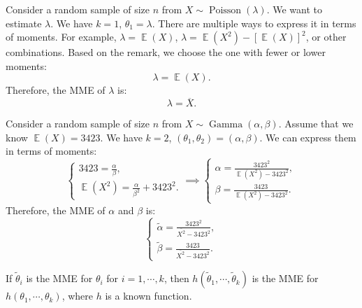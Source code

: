 \documentclass{huhtakm-template-book-v2}
\DeclareMathOperator{\E}{\mathbb{E}}
\DeclareMathOperator{\Poisson}{Poisson}
\DeclareMathOperator{\Gam}{Gamma}
\begin{document}
    \begin{eg}
        Consider a random sample of size $n$ from $X \sim \Poisson(\lambda)$. We want to estimate $\lambda$. We have $k = 1$, $\theta_{1} = \lambda$. There are multiple ways to express it in terms of moments. For example, $\lambda = \E(X)$, $\lambda = \E(X^{2}) - [\E(X)]^{2}$, or other combinations. Based on the remark, we choose the one with fewer or lower moments:
        \begin{equation*}
            \lambda = \E(X).
        \end{equation*}
        Therefore, the MME of $\lambda$ is:
        \begin{equation*}
            \lambda = \overline{X}.
        \end{equation*}
    \end{eg}
    \begin{eg}
        Consider a random sample of size $n$ from $X \sim \Gam(\alpha, \beta)$. Assume that we know $\E(X) = 3423$. We have $k = 2$, $(\theta_{1}, \theta_{2}) = (\alpha, \beta)$. We can express them in terms of moments:
        \begin{equation*}
            \begin{cases}
                3423 = \frac{\alpha}{\beta},\\
                \E(X^{2}) = \frac{\alpha}{\beta^{2}} + 3423^{2}.
            \end{cases} \implies \begin{cases}
                \alpha = \frac{3423^{2}}{\E(X^{2}) - 3423^{2}},\\
                \beta = \frac{3423}{\E(X^{2}) - 3423^{2}}.
            \end{cases}
        \end{equation*}
        Therefore, the MME of $\alpha$ and $\beta$ is:
        \begin{equation*}
            \begin{cases}
                \widetilde{\alpha} = \frac{3423^{2}}{\overline{X^{2}} - 3423^{2}},\\
                \widetilde{\beta} = \frac{3423}{\overline{X^{2}} - 3423^{2}}.
            \end{cases}
        \end{equation*}
    \end{eg}
    \begin{lem}
        If $\widetilde{\theta}_{i}$ is the MME for $\theta_{i}$ for $i = 1, \cdots, k$, then $h(\widetilde{\theta}_{1}, \cdots, \widetilde{\theta}_{k})$ is the MME for $h(\theta_{1}, \cdots, \theta_{k})$, where $h$ is a known function.
    \end{lem}
\end{document}
